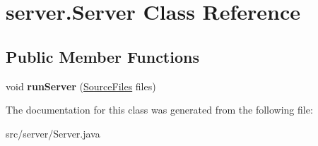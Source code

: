 \hypertarget{classserver_1_1_server}{
\section{server.Server Class Reference}
\label{classserver_1_1_server}
}
\subsection*{Public Member Functions}
\begin{DoxyCompactItemize}
\item 
\hypertarget{classserver_1_1_server_af47ca43b69652b4fdadaa5b63452618b}{
void {\bfseries runServer} (\hyperlink{interfaceserver_1_1_source_files}{SourceFiles} files)}
\label{classserver_1_1_server_af47ca43b69652b4fdadaa5b63452618b}

\end{DoxyCompactItemize}


The documentation for this class was generated from the following file:\begin{DoxyCompactItemize}
\item 
src/server/Server.java\end{DoxyCompactItemize}
